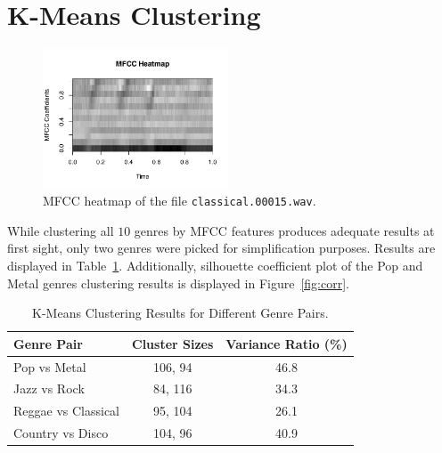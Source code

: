 \documentclass[twocolumn]{article}
\begin{document}
\section{K-Means Clustering}
\begin{figure}[hht]
\centering
\includegraphics[width=0.49\textwidth]{images/mfcc_heatmap_8.pdf}
\caption{MFCC heatmap of the file \texttt{classical.00015.wav}.}
\label{fig:mfcc}
\end{figure}
While clustering all $10$ genres by MFCC features produces adequate results at first sight, only two genres were picked for simplification purposes. Results are displayed in Table~\ref{table:clustering_results}. Additionally, silhouette coefficient plot of the Pop and Metal genres clustering results is displayed in Figure~\ref{fig:corr}.
\begin{table}[H]
\centering
\begin{tabular}{lcc}
  \hline
 \textbf{Genre Pair} & \textbf{Cluster Sizes} & \textbf{Variance Ratio (\%)} \\
  \hline
 Pop vs Metal & 106, 94 & 46.8 \\
 Jazz vs Rock & 84, 116 & 34.3 \\
 Reggae vs Classical & 95, 104 & 26.1 \\
 Country vs Disco & 104, 96 & 40.9 \\
  \hline
\end{tabular}
\caption{K-Means Clustering Results for Different Genre Pairs.}
\label{table:clustering_results}
\end{table}
\end{document}
